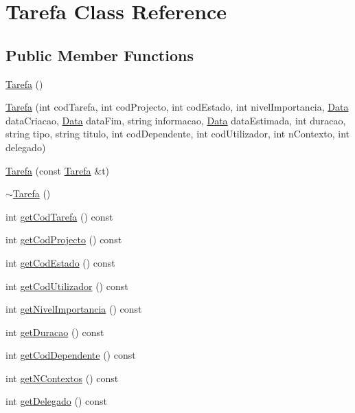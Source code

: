 \hypertarget{class_tarefa}{\section{Tarefa Class Reference}
\label{class_tarefa}
}
\subsection*{Public Member Functions}
\begin{DoxyCompactItemize}
\item 
\hyperlink{class_tarefa_a120eea6d4d78b034aec8da4ad4d773c0}{Tarefa} ()
\item 
\hyperlink{class_tarefa_aa8f23ede14310c61fa40ab16646a1cee}{Tarefa} (int cod\-Tarefa, int cod\-Projecto, int cod\-Estado, int nivel\-Importancia, \hyperlink{class_data}{Data} data\-Criacao, \hyperlink{class_data}{Data} data\-Fim, string informacao, \hyperlink{class_data}{Data} data\-Estimada, int duracao, string tipo, string titulo, int cod\-Dependente, int cod\-Utilizador, int n\-Contexto, int delegado)
\item 
\hyperlink{class_tarefa_a0c2f990dbb84beaadb950abecd104957}{Tarefa} (const \hyperlink{class_tarefa}{Tarefa} \&t)
\item 
\hyperlink{class_tarefa_ac0aded2b1a1333b92633e4f82d3d3ab7}{$\sim$\-Tarefa} ()
\item 
int \hyperlink{class_tarefa_a2cebb22d7a9e5993ce615c5e84b2c6e9}{get\-Cod\-Tarefa} () const 
\item 
int \hyperlink{class_tarefa_ac7d8c656e395261394dd5a4e21d05b47}{get\-Cod\-Projecto} () const 
\item 
int \hyperlink{class_tarefa_a77d2f0ee46d2ea9ba748ce9a93b6e8c7}{get\-Cod\-Estado} () const 
\item 
int \hyperlink{class_tarefa_a4664d01e62d6cd78b21179c5864c7966}{get\-Cod\-Utilizador} () const 
\item 
int \hyperlink{class_tarefa_a0447233a0d5d5c2a93f437684058d246}{get\-Nivel\-Importancia} () const 
\item 
int \hyperlink{class_tarefa_aae9980cb54f0d33f2eaa282d1bb95c35}{get\-Duracao} () const 
\item 
int \hyperlink{class_tarefa_a973b2fc5a7d329b3aa86b6cb450eaa50}{get\-Cod\-Dependente} () const 
\item 
int \hyperlink{class_tarefa_a5db3ff430e37ab92acef8d5b6876c625}{get\-N\-Contextos} () const 
\item 
int \hyperlink{class_tarefa_adb79135231d9790da3baa3a1db20599b}{get\-Delegado} () const 

\end{DoxyCompactItemize}
